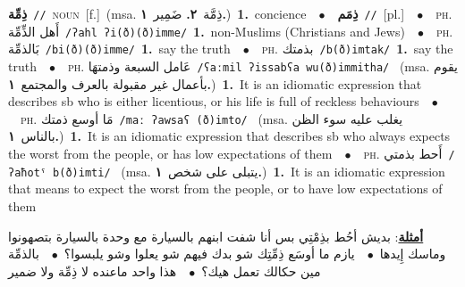 \documentclass[10pt,a4paper,twoside]{article} %
\begin{document}
\begin{multicols}{2}
{{{{{{{{\setlength\topsep{0pt}\textbf{\foreignlanguage{arabic}{ذِمِّة}}\ {\color{gray}\texttt{//}\color{black}}\ \textsc{noun}\ [f.]\ \color{gray}(msa. \foreignlanguage{arabic}{ذِمَّة}~\foreignlanguage{arabic}{\textbf{٢.}}  \foreignlanguage{arabic}{ضَمِير}~\foreignlanguage{arabic}{\textbf{١.}})\color{black}\ \textbf{1.}~concience\ \ $\bullet$\ \ \setlength\topsep{0pt}\textbf{\foreignlanguage{arabic}{ذِمَم}}\ {\color{gray}\texttt{//}\color{black}}\ [pl.]\ \ $\bullet$\ \ \textsc{ph.} \color{gray} \foreignlanguage{arabic}{أَهل الذِّمِّة}\color{black}\ {\color{gray}\texttt{/{\sffamily ʔahl ʔi(ð)(ð)imme}/}\color{black}}\ \textbf{1.}~non-Muslims (Christians and Jews)\ \ $\bullet$\ \ \textsc{ph.} \color{gray} \foreignlanguage{arabic}{بَالذمِّة}\color{black}\ {\color{gray}\texttt{/{\sffamily bi(ð)(ð)imme}/}\color{black}}\ \textbf{1.}~say the truth\ \ $\bullet$\ \ \textsc{ph.} \color{gray} \foreignlanguage{arabic}{بذمتك}\color{black}\ {\color{gray}\texttt{/{\sffamily b(ð)imtak}/}\color{black}}\ \textbf{1.}~say the truth\ \ $\bullet$\ \ \textsc{ph.} \color{gray} \foreignlanguage{arabic}{عَامل السبعة وذمتهَا}\color{black}\ {\color{gray}\texttt{/{\sffamily ʕaːmil ʔissabʕa wu(ð)immitha}/}\color{black}}\ \color{gray} (msa. \foreignlanguage{arabic}{يقوم بأعمال غير مقبولة بالعرف والمجتمع}~\foreignlanguage{arabic}{\textbf{١.}})\color{black}\ \textbf{1.}~It is an idiomatic expression that describes sb who is either licentious, or his life is full of reckless behaviours\ \ $\bullet$\ \ \textsc{ph.} \color{gray} \foreignlanguage{arabic}{مَا أوسع ذمتك}\color{black}\ {\color{gray}\texttt{/{\sffamily maː ʔawsaʕ (ð)imto}/}\color{black}}\ \color{gray} (msa. \foreignlanguage{arabic}{يغلب عليه سوء الظن بالناس}~\foreignlanguage{arabic}{\textbf{١.}})\color{black}\ \textbf{1.}~It is an idiomatic expression that describes sb who always expects the worst from the people, or has low expectations of them\ \ $\bullet$\ \ \textsc{ph.} \color{gray} \foreignlanguage{arabic}{أَحط بذمتي}\color{black}\ {\color{gray}\texttt{/{\sffamily ʔaħotˤ b(ð)imti}/}\color{black}}\ \color{gray} (msa. \foreignlanguage{arabic}{يتبلى على شخص}~\foreignlanguage{arabic}{\textbf{١.}})\color{black}\ \textbf{1.}~It is an idiomatic expression that means to expect the worst from the people, or to have low expectations of them\  \begin{flushright}\color{gray}\foreignlanguage{arabic}{\textbf{\underline{\foreignlanguage{arabic}{أمثلة}}}: بديش أحُط بذِمْتِي بس أنا شفت ابنهم بالسيارة مع وحدة بالسيارة بتصهونوا وماسك إِيدها\ $\bullet$\ \  يازم ما أوسَع ذِمِّتِك شو بدك فيهم شو يعلوا وشو يلبسوا؟\ $\bullet$\ \  بالذمِّة مين حكالك تعمل هيك؟\ $\bullet$\ \  هذا واحد ماعنده لا ذِمِّة ولا ضمير}\end{flushright}\color{black}} \vspace{2mm}

}}}}}}}
\end{multicols}
\end{document}

